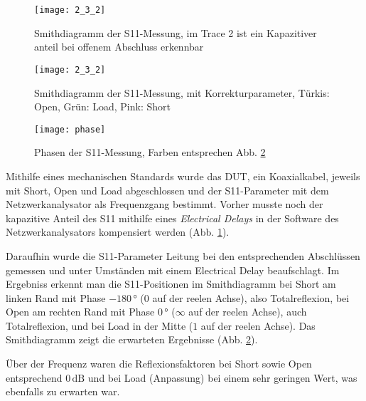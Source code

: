 \begin{figure}[h]
  \texttt{[image: 2\_3\_2]}
  \caption{Smithdiagramm der S11-Messung, im Trace 2 ist ein Kapazitiver anteil
    bei offenem Abschluss erkennbar}
  \label{fig:2_3_2}
\end{figure}

\begin{figure}[h]
  \begin{center}
  \texttt{[image: 2\_3\_2]}
  \caption{Smithdiagramm der S11-Messung, mit Korrekturparameter, Türkis: Open,
    Grün: Load, Pink: Short}
  \label{fig:2_3_1}
  \end{center}
\end{figure}

\begin{figure}[h]
  \begin{center}
  \texttt{[image: phase]}
  \caption{Phasen der S11-Messung, Farben entsprechen Abb. \ref{fig:2_3_1}}
  \label{fig:phase_2_3}
  \end{center}
\end{figure}

Mithilfe eines mechanischen Standards wurde das DUT, ein Koaxialkabel,
jeweils mit Short, Open und Load abgeschlossen und der S11-Parameter mit dem
Netzwerkanalysator als Frequenzgang bestimmt. Vorher musste noch der kapazitive
Anteil des S11 mithilfe eines \emph{Electrical Delays} in der Software des
Netzwerkanalysators kompensiert werden (Abb. \ref{fig:2_3_2}).

Daraufhin wurde
die S11-Parameter Leitung bei den entsprechenden Abschlüssen gemessen und unter
Umständen mit einem Electrical Delay beaufschlagt. Im Ergebniss erkennt man die
S11-Positionen im Smithdiagramm bei Short am linken Rand mit Phase $-180 \, \si{\degree}$ (0 auf der reelen
Achse), also Totalreflexion, bei Open am rechten Rand mit Phase $0 \, \si{\degree}$ ($\infty$ auf der reelen
Achse), auch Totalreflexion, und bei Load in der Mitte ($1$ auf der reelen
Achse). Das Smithdiagramm zeigt die erwarteten Ergebnisse (Abb. \ref{fig:2_3_1}).

Über der Frequenz
waren die Reflexionsfaktoren bei Short sowie Open entsprechend $0 \,
\si{\deci\bel}$ und bei Load (Anpassung) bei einem sehr geringen Wert, was
ebenfalls zu erwarten war.
